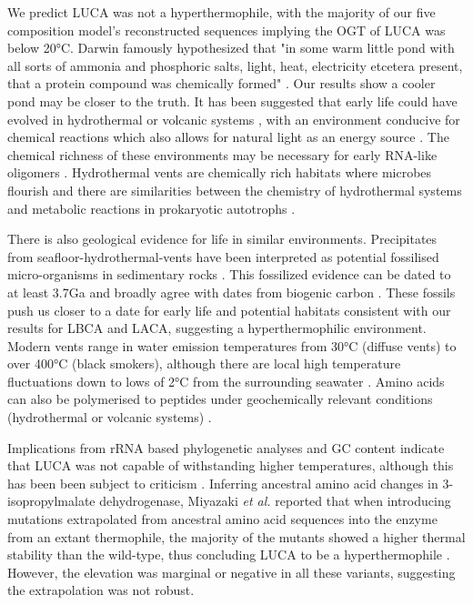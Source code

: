 We predict LUCA was not a hyperthermophile, with the majority of our five composition model's reconstructed sequences implying the OGT of LUCA was below 20°C. Darwin famously hypothesized that "in some warm little pond with all sorts of ammonia and phosphoric salts, light, heat, electricity etcetera present, that a protein compound was chemically formed" \cite{follmann2009darwin}. Our results show a cooler pond may be closer to the truth. It has been suggested that early life could have evolved in hydrothermal or volcanic systems \cite{mulkidjanian2012origin}, with an environment conducive for chemical reactions which also allows for natural light as an energy source \cite{mulkidjanian2012origin}. The chemical richness of these environments may be necessary for early RNA-like oligomers \cite{ricardo2004borate,grew2011borate}. Hydrothermal vents \cite{baross1985submarine} are chemically rich habitats where microbes flourish and there are similarities between the chemistry of hydrothermal systems and metabolic reactions in prokaryotic autotrophs \cite{martin2008hydrothermal,lane2010did}. 

There is also geological evidence for life in similar environments. Precipitates from seafloor-hydrothermal-vents have been interpreted as potential fossilised micro-organisms in sedimentary rocks \cite{dodd2017evidence}. This fossilized evidence can be dated to at least 3.7Ga and broadly agree with dates from biogenic carbon \cite{bell2015potentially}. These fossils push us closer to a date for early life and potential habitats consistent with our results for LBCA and LACA, suggesting a hyperthermophilic environment. Modern vents range in water emission temperatures from 30°C (diffuse vents) to over 400°C (black smokers), although there are local high temperature fluctuations down to lows of 2°C from the surrounding seawater \cite{lutz1993ecology,minic2006adaptation}. Amino acids can also be polymerised to peptides under geochemically relevant conditions (hydrothermal or volcanic systems) \cite{huber1998peptides}. 

Implications from rRNA based phylogenetic analyses \cite{woese1987bacterial,pace1997molecular} and GC content \cite{galtier1999nonhyperthermophilic} indicate that LUCA was not capable of withstanding higher temperatures, although this has been been subject to criticism \cite{di2003universal}. Inferring ancestral amino acid changes in 3-isopropylmalate dehydrogenase, Miyazaki \textit{et al.} reported that when introducing mutations extrapolated from ancestral amino acid sequences into the enzyme from an extant thermophile, the majority of the mutants showed a higher thermal stability than the wild-type, thus concluding LUCA to be a hyperthermophile \cite{miyazaki2001ancestral}. However, the elevation was marginal or negative in all these variants, suggesting the extrapolation was not robust. 

